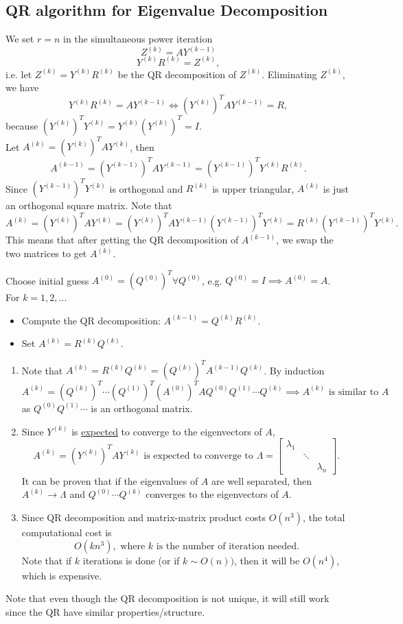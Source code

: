 \documentclass[../main/main.tex]{subfiles}
\begin{document}
	\subsection{QR algorithm for Eigenvalue Decomposition}
	We set $r=n$ in the simultaneous power iteration
	\[
		Z^{(k)}=AY^{(k-1)}
	\]\[
	Y^{(k)}R^{(k)}=Z^{(k)}
,\] i.e. let $Z^{(k)}=Y^{(k)}R^{(k)}$ be the QR decomposition of $Z^{(k)}$.
Eliminating $Z^{(k)}$, we have \[
	Y^{(k)}R^{(k)}=AY^{(k-1)}\iff (Y^{(k)})^TAY^{(k-1)}=R
,\] because $(Y^{(k)})^TY^{(k)}=Y^{(k)}(Y^{(k)})^T=I$.\\

Let $A^{(k)}=(Y^{(k)})^TAY^{(k)}$, then \[
	A^{(k-1)}=(Y^{(k-1)})^TAY^{(k-1)}=(Y^{(k-1)})^TY^{(k)}R^{(k)}
.\] Since $(Y^{(k-1)})^TY^{(k)}$ is orthogonal and $R^{(k)}$ is upper triangular, $A^{(k)}$ is just an orthogonal square matrix. Note that \[
A^{(k)}=(Y^{(k)})^TAY^{(k)}=(Y^{(k)})^TAY^{(k-1)}(Y^{(k-1)})^TY^{(k)}=R^{(k)}(Y^{(k-1)})^TY^{(k)}
.\]  This means that after getting the QR decomposition of $A^{(k-1)}$, we swap the two matrices to get $A^{(k)}$.
\begin{algo}[QR Algorithm]
	Choose initial guess $A^{(0)}=(Q^{(0)})^T\forall Q^{(0)}$, e.g. $Q^{(0)}=I\implies A^{(0)}=A$.\\
	For $k=1,2,\ldots$
	\begin{itemize}
		\item Compute the QR decomposition: $A^{(k-1)}=Q^{(k)}R^{(k)}$.
		\item Set $A^{(k)}=R^{(k)}Q^{(k)}$.
	\end{itemize}
\end{algo}
\begin{remark}
	\begin{enumerate}
		\item Note that $A^{(k)}=R^{(k)}Q^{(k)}=(Q^{(k)})^{T}A^{(k-1)}Q^{(k)}$. By induction  \[
				A^{(k)}=(Q^{(k)})^T\cdots (Q^{(1)})^{T}(A^{(0)})^TAQ^{(0)}Q^{(1)}\cdots Q^{(k)}\implies A^{(k)}\text{ is similar to }A
			\] as $Q^{(0)}Q^{(1)}\cdots$ is an orthogonal matrix.
		\item Since $Y^{(k)}$ is \underline{expected} to converge to the eigenvectors of $A$, \[
				A^{(k)}=(Y^{(k)})^TAY^{(k)}\text{ is expected to converge to }\Lambda=\begin{bmatrix} \lambda_1&&\\&\ddots&\\&&\lambda_n \end{bmatrix} 
			.\] It can be proven that if the eigenvalues of $A$ are well separated, then $A^{(k)}\to \Lambda$ and $Q^{(0)}\cdots Q^{(k)}$ converges to the eigenvectors of $A$. 
		\item Since QR decomposition and matrix-matrix product costs $O(n^3)$, the total computational cost is \[
				O(kn^3),\text{ where $k$ is the number of iteration needed}
			.\] Note that if $k$ iterations is done (or if $k\sim O(n))$, then it will be $O(n^4)$, which is expensive. 
\end{enumerate}
\end{remark}
Note that even though the QR decomposition is not unique, it will still work since the QR have similar properties/structure.
\end{document}
